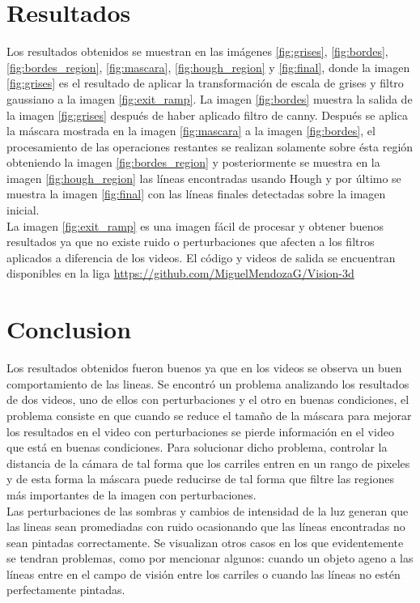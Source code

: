 \documentclass[10pt]{IEEEtran}
\begin{document}
\section{Resultados}
Los resultados obtenidos se muestran en las imágenes \ref{fig:grises}, \ref{fig:bordes}, \ref{fig:bordes_region}, \ref{fig:mascara}, \ref{fig:hough_region} y \ref{fig:final}, donde la imagen \ref{fig:grises} es el resultado de aplicar la transformación de escala de grises y filtro gaussiano a la imagen \ref{fig:exit_ramp}. La imagen \ref{fig:bordes} muestra la salida de la imagen \ref{fig:grises} después de haber aplicado filtro de canny. Después se aplica la máscara mostrada en la imagen \ref{fig:mascara} a la imagen \ref{fig:bordes}, el procesamiento de las operaciones restantes se realizan solamente sobre ésta región obteniendo la imagen \ref{fig:bordes_region} y posteriormente se muestra en la imagen \ref{fig:hough_region} las líneas encontradas usando Hough y por último se muestra la imagen \ref{fig:final} con las líneas finales detectadas sobre la imagen inicial.\\
La imagen \ref{fig:exit_ramp} es una imagen fácil de procesar y obtener buenos resultados ya que no existe ruido o perturbaciones que afecten a los filtros aplicados a diferencia de los videos. El código y videos de salida se encuentran disponibles en la liga \url{https://github.com/MiguelMendozaG/Vision-3d}


\section{Conclusion}
Los resultados obtenidos fueron buenos ya que en los videos se observa un buen comportamiento de las lineas. Se encontró un problema analizando los resultados de dos videos, uno de ellos con perturbaciones y el otro en buenas condiciones, el problema consiste en que cuando se reduce el tamaño de la máscara para mejorar los resultados en el video con perturbaciones se pierde información en el video que está en buenas condiciones. Para solucionar dicho problema, controlar la distancia de la cámara de tal forma que los carriles entren en un rango de pixeles y de esta forma la máscara puede reducirse de tal forma que filtre las regiones más importantes de la imagen con perturbaciones.\\ Las perturbaciones de las sombras y cambios de intensidad de la luz generan que las lineas sean promediadas con ruido ocasionando que las líneas encontradas no sean pintadas correctamente. Se visualizan otros casos en los que evidentemente se tendran problemas, como por mencionar algunos: cuando un objeto ageno a las líneas entre en el campo de visión entre los carriles o cuando las líneas no estén perfectamente pintadas. 
\end{document}

